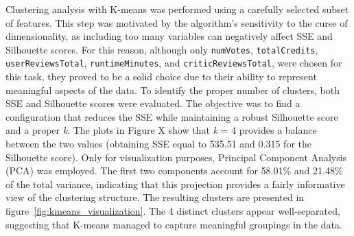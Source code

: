 Clustering analysis with K-means was performed using a carefully selected subset of features. 
This step was motivated by the algorithm's sensitivity to the curse of dimensionality, as including too many variables can negatively affect SSE and Silhouette scores.
For this reason, although only \texttt{numVotes}, \texttt{totalCredits}, \texttt{userReviewsTotal}, \texttt{runtimeMinutes}, and \texttt{criticReviewsTotal},
were chosen for this task, they proved to be a solid choice due to their ability to represent meaningful aspects of the data.
To identify the proper number of clusters, both SSE and Silhouette scores were evaluated. 
The objective was to find a configuration that reduces the SSE while maintaining a robust Silhouette score and a proper \textit{k}. 
The plots in Figure X show that \textit{k} = 4 provides a balance between the two values (obtaining SSE equal to 535.51 and 0.315 for the Silhouette score).
Only for visualization purposes, Principal Component Analysis (PCA) was employed. 
The first two components account for 58.01\% and 21.48\% of the total variance, indicating that this projection provides a fairly informative view of the clustering structure. 
The resulting clusters are presented in figure~\ref{fig:kmeans_visualization}. 
The 4 distinct clusters appear well-separated, suggesting that K-means managed to capture meaningful groupings in the data.




 

